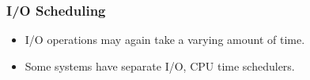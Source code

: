 \begin{frame}

\frametitle{I/O Scheduling}

\begin{itemize}

\item I/O operations may again take a varying amount of time.

\item Some systems have separate I/O, CPU time schedulers.

\end{itemize}

\end{frame}
